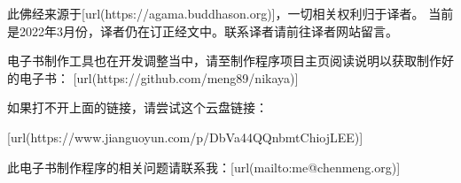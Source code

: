 此佛经来源于[url(https://agama.buddhason.org)]，一切相关权利归于译者。
当前是2022年3月份，译者仍在订正经文中。联系译者请前往译者网站留言。
\blank

电子书制作工具也在开发调整当中，请至制作程序项目主页阅读说明以获取制作好的电子书：
[url(https://github.com/meng89/nikaya)]

\blank
如果打不开上面的链接，请尝试这个云盘链接：

[url(https://www.jianguoyun.com/p/DbVa44QQnbmtChiojLEE)]

\blank
此电子书制作程序的相关问题请联系我：[url(mailto:me@chenmeng.org)]